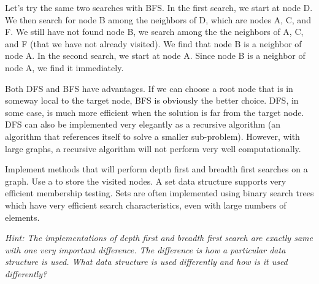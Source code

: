 Let's try the same two searches with BFS.
In the first search, we start at node D.
We then search for node B among the neighbors of D, which are nodes A, C, and F.
We still have not found node B, we search among the the neighbors of A, C, and F (that we have not already visited).
We find that node B is a neighbor of node A.
In the second search, we start at node A.  Since node B is a neighbor of node A, we find it immediately.

Both DFS and BFS have advantages.  
If we can choose a root node that is in someway local to the target node, BFS is obviously the better choice.
DFS, in some case, is much more efficient when the solution is far from the target node.
DFS can also be implemented very elegantly as a recursive algorithm (an algorithm that references itself to solve a smaller sub-problem).
However, with large graphs, a recursive algorithm will not perform very well computationally.

\begin{problem}
Implement methods that will perform depth first and breadth first searches on a graph.
Use a  to store the visited nodes.  A set data structure supports very efficient membership testing.
Sets are often implemented using binary search trees which have very efficient search characteristics, even with large numbers of elements.

\textit{Hint: The implementations of depth first and breadth first search are exactly same with one very important difference.
The difference is how a particular data structure is used.  What data structure is used differently and how is it used differently?}
\end{problem}
